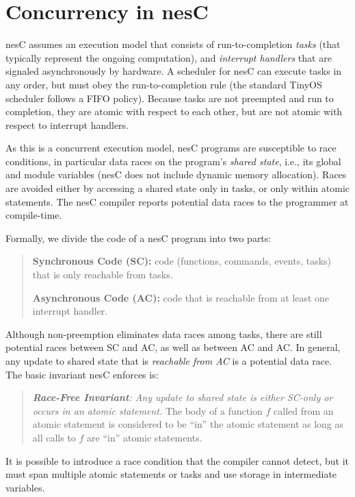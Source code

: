 \documentclass[11pt,letterpaper]{article}
\newcommand{\nesc}{nesC\xspace}
\newcommand{\tinyos}{TinyOS\xspace}
\begin{document}
\section{Concurrency in \nesc}
\label{sec:concurrency}

\nesc assumes an execution model that consists of run-to-completion
\emph{tasks} (that typically represent the ongoing computation), and
\emph{interrupt handlers} that are signaled asynchronously by hardware.  A
scheduler for \nesc can execute tasks in any order, but must obey the
run-to-completion rule (the standard \tinyos scheduler follows a FIFO
policy). Because tasks are not preempted and run to completion, they are
atomic with respect to each other, but are not atomic with respect to
interrupt handlers.

As this is a concurrent execution model, \nesc programs are susceptible to
race conditions, in particular data races on the program's \emph{shared
state}, i.e., its global and module variables (\nesc does not include
dynamic memory allocation). Races are avoided either by accessing a
shared state only in tasks, or only within atomic statements. The \nesc
compiler reports potential data races to the programmer at compile-time.

Formally, we divide the code of a \nesc program into two parts:
\begin{quote}
\textbf{Synchronous Code (SC):} code (functions, commands, events, tasks)
that is only reachable from tasks.

\textbf{Asynchronous Code (AC):} code that is reachable from at 
least one interrupt handler.
\end{quote}

Although non-preemption eliminates data races among tasks, there are still
potential races between SC and AC, as well as between AC and AC.  In
general, any update to shared state that is {\em reachable from AC} is a
potential data race.  The basic invariant \nesc enforces is:
\begin{quote}
{\sl {\bf Race-Free Invariant}: Any update to shared state is either
SC-only or occurs in an atomic statement.} The body of a function $f$
called from an atomic statement is considered to be ``in'' the atomic
statement as long as all calls to $f$ are ``in'' atomic statements.
\end{quote}

It is possible to introduce a race condition that the compiler cannot
detect, but it must span multiple atomic statements or tasks and use storage
in intermediate variables.
\end{document}
